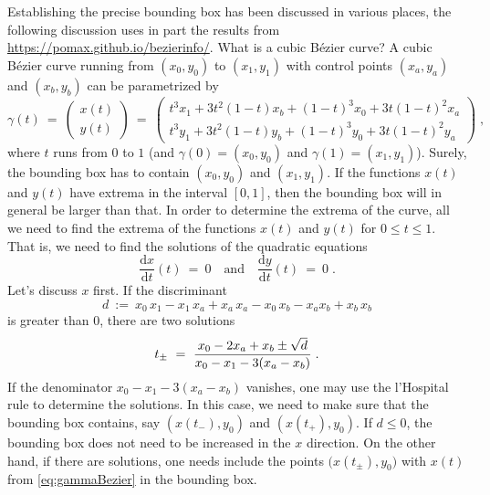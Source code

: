 Establishing the precise bounding box has been discussed in various places, the
following discussion uses in part the results from
\url{https://pomax.github.io/bezierinfo/}. What is a cubic B\'ezier curve? A
cubic B\'ezier curve running from $(x_0,y_0)$ to $(x_1,y_1)$ with control points
$(x_a,y_a)$ and $(x_b,y_b)$ can be parametrized by
\begin{equation}
 \gamma(t)~=~
 \begin{pmatrix} x(t)\\ y(t) \end{pmatrix}~=~
 \begin{pmatrix}t^3 x_{1}+3 t^2 (1-t) x_{b}+(1-t)^3
   x_{0}+3 t (1-t)^2 x_{a}\\
   t^3 y_{1}+3
   t^2 (1-t) y_{b}+(1-t)^3 y_{0}+3 t (1-t)^2
   y_{a}\end{pmatrix}\;,\label{eq:gammaBezier}
\end{equation}
where $t$ runs from $0$ to $1$ (and $\gamma(0)=(x_0,y_0)$ and
$\gamma(1)=(x_1,y_1)$). Surely, the bounding box has to contain
$(x_0,y_0)$ and $(x_1,y_1)$. If the functions $x(t)$ and $y(t)$ have extrema in
the interval $[0,1]$, then the bounding box will in general be larger than that.
In order to determine the extrema of the curve, all
we need to find the extrema of the functions $x(t)$ and $y(t)$ for $0\le t\le
1$. That is, we need to find the solutions of the quadratic equations
\begin{equation}
 \frac{\mathrm{d}x}{\mathrm{d}t}(t)~=~0\quad\text{and}\quad
 \frac{\mathrm{d}y}{\mathrm{d}t}(t)~=~0\;.
\end{equation}
Let's discuss $x$ first. If the discriminant
\begin{equation}
 d~:=~x_0\,x_1 - x_1\,x_a + x_a\,x_a - x_0\,x_b - x_a x_b +  x_b\,x_b
\end{equation}
is greater than 0, there are two solutions
\begin{equation}
 t_\pm~=~\frac{x_{0}-2x_{a}+x_{b}\pm\sqrt{d}}{%
 	x_{0}-x_{1}-3(x_{a}- x_{b})} \;.
\end{equation}  
If the denominator $x_{0}-x_{1}-3(x_{a}- x_{b})$  vanishes, one may use the
l'Hospital rule to determine the solutions.
In this case, we need to make sure that the bounding box contains, say
$(x(t_-),y_0)$ and $(x(t_+),y_0)$. If $d\le0$, the bounding box does not need to
be increased in the $x$ direction. On the other hand, if there are solutions,
one needs include the points $\bigl(x(t_\pm),y_0\bigr)$ with $x(t)$ from
\eqref{eq:gammaBezier} in the bounding box. 

